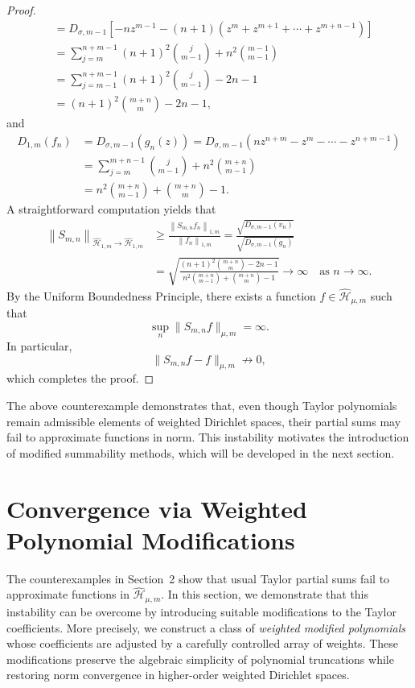 \documentclass[12pt,reqno]{amsart}
\begin{document}
\begin{proof}
\begin{align*}
&= D_{\sigma ,m - 1} [ - n z^{m - 1} - (n + 1) \left( z^m + z^{m + 1} + \cdots + z^{m + n - 1} \right) ] \\
&= \sum_{j = m}^{n + m - 1} (n + 1)^2 \binom{j}{m - 1} + n^2 \binom{m - 1}{m - 1} \\
&= \sum_{j = m-1}^{n + m - 1} (n + 1)^2 \binom{j}{m - 1} - 2n - 1 \\
&= (n+1)^2 \binom{m+n}{m} - 2n - 1,
\end{align*}
and
\begin{align*}
D_{1,m}(f_n)&=D_{\sigma ,m - 1} ({g_n}(z))= D_{\sigma ,m - 1} \left( n z^{n + m} - z^m - \cdots - z^{n + m - 1} \right) \\
&= \sum_{j = m}^{m + n - 1} \binom{j}{m - 1} + n^2 \binom{m + n}{m - 1} \\
&= n^2 \binom{m + n}{m - 1} + \binom{m + n}{m} - 1.
\end{align*}
A straightforward computation yields that
\begin{align*}
\left\| S_{m,n} \right\|_{\widehat{\mathcal{H}}_{1,m} \to \widehat{\mathcal{H}}_{1,m}}
&\ge \frac{\left\| S_{m,n} f_n \right\|_{1,m}}{\left\| f_n \right\|_{1,m}}
= \frac{\sqrt{D_{\sigma,m-1}(v_n)}}{\sqrt{D_{\sigma,m-1}(g_n)}} \\
&= \sqrt{\frac{(n+1)^2 \binom{m+n}{m} - 2n - 1}{n^2 \binom{m+n}{m-1} + \binom{m+n}{m} - 1}}
\rightarrow \infty \quad \text{as } n \to \infty.
\end{align*}
By the Uniform Boundedness Principle, there exists a function
\( f \in \widehat{\mathcal{H}}_{\mu,m} \)
such that
\[
\sup_n \| S_{m,n} f \|_{\mu,m} = \infty.
\]
In particular,
\[
\| S_{m,n}f - f \|_{\mu,m} \not\to 0,
\]
which completes the proof.
\end{proof}

The above counterexample demonstrates that, even though Taylor polynomials remain admissible elements of weighted Dirichlet spaces, their partial sums may fail to approximate functions in norm.
This instability motivates the introduction of modified summability methods, which will be developed in the next section.

\section{Convergence via Weighted Polynomial Modifications}

The counterexamples in Section~2 show that usual Taylor partial sums fail to approximate functions in
$\widehat{\mathcal{H}}_{\mu,m}$.
In this section, we demonstrate that this instability can be overcome by introducing suitable modifications to the Taylor coefficients.
More precisely, we construct a class of \emph{weighted modified polynomials} whose coefficients are adjusted by a carefully controlled array of weights.
These modifications preserve the algebraic simplicity of polynomial truncations while restoring norm convergence in higher-order weighted Dirichlet spaces.
\end{document}
